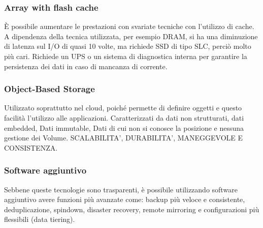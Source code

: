 \documentclass[8pt,a4paper]{extarticle}
\begin{document}
\begin{multicols*}{4}
\subsubsection{Array with flash cache}
È possibile aumentare le prestazioni con svariate tecniche con l'utilizzo di cache. A dipendenza della tecnica utilizzata, per esempio DRAM, si ha una diminuzione di latenza sul I/O di quasi 10 volte, ma richiede SSD di tipo SLC, perciò molto più cari. Richiede un UPS o un sistema di diagnostica interna per garantire la persistenza dei dati in caso di mancanza di corrente.

\subsubsection{Object-Based Storage}
Utilizzato soprattutto nel cloud, poiché permette di definire oggetti e questo facilità l’utilizzo alle applicazioni. Caratterizzati da dati non strutturati, dati embedded, Dati immutable, Dati di cui non si conosce la posizione e nessuna gestione dei Volume. SCALABILITA’, DURABILITA’, MANEGGEVOLE E CONSISTENZA.
\subsubsection{Software aggiuntivo}
Sebbene queste tecnologie sono trasparenti, è possibile utilizzando software aggiuntivo avere funzioni più avanzate come: backup più veloce e consistente, deduplicazione, spindown, disaster recovery, remote mirroring e configurazioni più flessibili (data tiering).
\end{multicols*}
\end{document}

